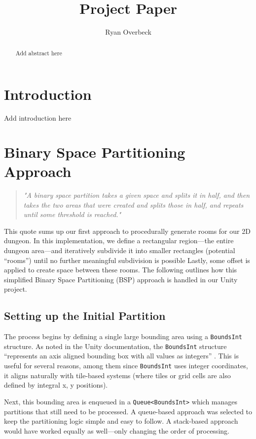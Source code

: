 \documentclass[a4paper, 12pt, one column, aas_macros]{article}
\title{Project Paper}
\author{Ryan Overbeck}
\begin{document}
\maketitle

\begin{abstract}
Add abstract here
\end{abstract}

\section{Introduction}

Add introduction here

\section{Binary Space Partitioning Approach}
\begin{quote}
  \emph{"A binary space partition takes a given space and splits it in half, and then takes the two areas that were created and splits those in half, and repeats until some threshold is reached."}
  \cite[p.~293]{ShortAdams2017}
\end{quote}

This quote sums up our first approach to procedurally generate rooms for our 2D dungeon. In this implementation, we define a rectangular region---the entire dungeon area---and iteratively subdivide it into smaller rectangles (potential ``rooms'') until no further meaningful subdivision is possible Lastly, some offset is applied to create space between these rooms. The following outlines how this simplified Binary Space Partitioning (BSP) approach is handled in our Unity project.

\subsection{Setting up the Initial Partition}
The process begins by defining a single large bounding area using a \texttt{BoundsInt} structure. As noted in the Unity documentation, the \texttt{BoundsInt} structure ``represents an axis aligned bounding box with all values as integers'' \citep{unity_docs}. This is useful for several reasons, among them since \texttt{BoundsInt} uses integer coordinates, it aligns naturally with tile-based systems (where tiles or grid cells are also defined by integral x, y positions).

Next, this bounding area is enqueued in a \texttt{Queue<BoundsInt>} which manages partitions that still need to be processed. A queue-based approach was selected to keep the partitioning logic simple and easy to follow. A stack-based approach would have worked equally as well---only changing the order of processing.
\end{document}
